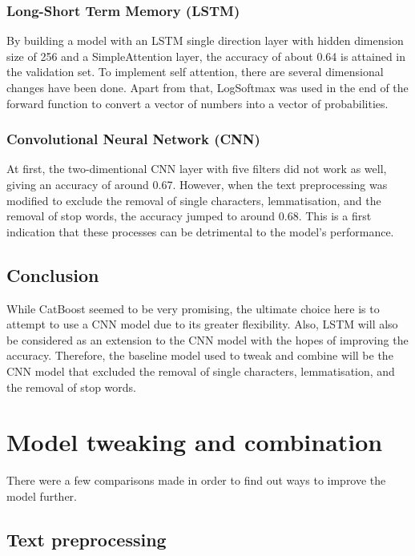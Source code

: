 \documentclass[11pt,a4paper]{article}
\begin{document}
	\subsubsection{Long-Short Term Memory (LSTM)}
	
	By building a model with an LSTM single direction layer with hidden dimension size of 256 and a SimpleAttention layer, the accuracy of about 0.64 is attained in the validation set. To implement self attention, there are several dimensional changes have been done. Apart from that, LogSoftmax was used in the end of the forward function to convert a vector of numbers into a vector of probabilities. 
	
	\subsubsection{Convolutional Neural Network (CNN)}
	
	At first, the two-dimentional CNN layer with five filters did not work as well, giving an accuracy of around 0.67. However, when the text preprocessing was modified to exclude the removal of single characters, lemmatisation, and the removal of stop words, the accuracy jumped to around 0.68. This is a first indication that these processes can be detrimental to the model's performance.
	
	\subsection{Conclusion}
	
	While CatBoost seemed to be very promising, the ultimate choice here is to attempt to use a CNN model due to its greater flexibility. Also, LSTM will also be considered as an extension to the CNN model with the hopes of improving the accuracy. Therefore, the baseline model used to tweak and combine will be the CNN model that excluded the removal of single characters, lemmatisation, and the removal of stop words.
	
	
	\newpage
	\section{Model tweaking and combination}
	
	There were a few comparisons made in order to find out ways to improve the model further.
	
	\subsection{Text preprocessing}
	
\end{document}
